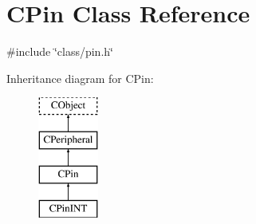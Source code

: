 \hypertarget{class_c_pin}{\section{C\-Pin Class Reference}
\label{class_c_pin}
}


{\ttfamily \#include \char`\"{}class/pin.\-h\char`\"{}}

Inheritance diagram for C\-Pin\-:\begin{figure}[H]
\begin{center}
\leavevmode
\includegraphics[height=4.000000cm]{d7/db9/class_c_pin}
\end{center}
\end{figure}

